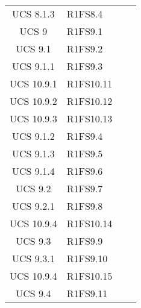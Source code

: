 {\begin{longtable}{ c C{4cm} c c}
UCS 8.1.3 & R1FS8.4\\

UCS 9 & R1FS9.1\\

UCS 9.1 & R1FS9.2\\


UCS 9.1.1 & R1FS9.3\\

UCS 10.9.1 & R1FS10.11\\

UCS 10.9.2 & R1FS10.12\\

UCS 10.9.3 & R1FS10.13\\

UCS 9.1.2 & R1FS9.4\\

UCS 9.1.3 & R1FS9.5\\

UCS 9.1.4 & R1FS9.6\\

UCS 9.2 & R1FS9.7\\

UCS 9.2.1 & R1FS9.8\\


UCS 10.9.4 & R1FS10.14\\

UCS 9.3 & R1FS9.9\\

UCS 9.3.1 & R1FS9.10\\

UCS 10.9.4 & R1FS10.15\\

UCS 9.4 & R1FS9.11\\

\end{longtable}
}






















